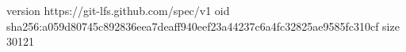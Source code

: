 version https://git-lfs.github.com/spec/v1
oid sha256:a059d80745c892836eea7deaff940eef23a44237c6a4fc32825ae9585fc310cf
size 30121
